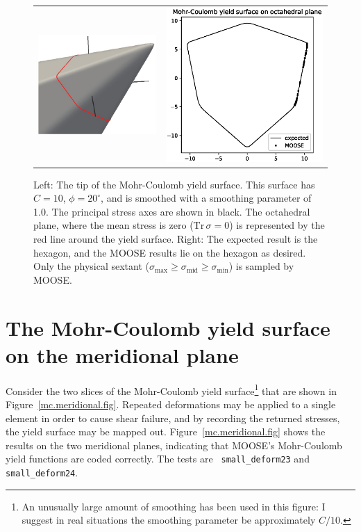 \documentclass[]{scrreprt}
\newcommand{\tr}{\mbox{Tr}\,}
\newcommand{\smax}{\sigma_{\mathrm{max}}}
\newcommand{\smid}{\sigma_{\mathrm{mid}}}
\newcommand{\smin}{\sigma_{\mathrm{min}}}
\begin{document}
\begin{figure}[htb]
  \begin{center}
    \begin{tabular}{ll}
\includegraphics[width=6cm]{mc_octahedral_plane.eps} &
\includegraphics[width=8cm]{small_deform_21.eps}
\end{tabular}
\caption{Left: The tip of the Mohr-Coulomb yield surface.  This surface has
  $C=10$, $\phi=20^{\circ}$, and is smoothed with a smoothing
  parameter of 1.0.  The
  principal stress axes are shown in black.  The octahedral plane,
  where the mean stress is zero ($\tr\sigma=0$) is represented by the red line
  around the yield surface.  Right: The expected result
  is the hexagon, and the MOOSE results lie on the hexagon as
  desired.  Only the physical sextant ($\smax\geq\smid\geq\smin$) is
  sampled by MOOSE.}
\label{mc_octahedral_plane.fig}
\end{center}
\end{figure}


\section{The Mohr-Coulomb yield surface on the meridional plane}

Consider the two slices of the Mohr-Coulomb yield surface\footnote{An
  unusually large amount of smoothing has been used in this figure: I
  suggest in real situations the smoothing parameter be approximately
  $C/10$.} that are shown in Figure~\ref{mc.meridional.fig}.
Repeated deformations may be applied to a single element in order to
cause shear failure, and by recording the returned stresses, the yield
surface may be mapped out.  Figure~\ref{mc.meridional.fig} shows the results on the two
meridional planes, indicating that MOOSE's
Mohr-Coulomb yield functions are coded correctly.  The tests are {\tt
  small\_deform23} and {\tt small\_deform24}.
\end{document}
